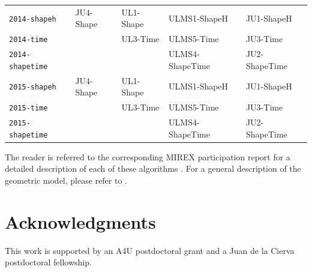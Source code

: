 \documentclass[twoside]{article}
\begin{document}
\begin{table}[!h]
\begin{tabular}{l|llll}
	\texttt{2014-shapeh}     & \textsf{JU4-Shape}      & \textsf{UL1-Shape} & \textsf{ULMS1-ShapeH}    & \textsf{JU1-ShapeH}    \\
	\texttt{2014-time}       &                         & \textsf{UL3-Time}  & \textsf{ULMS5-Time}      & \textsf{JU3-Time}      \\
	\texttt{2014-shapetime}  &                         &                    & \textsf{ULMS4-ShapeTime} & \textsf{JU2-ShapeTime} \\ \hline
	\texttt{2015-shapeh}     & \textsf{JU4-Shape}      & \textsf{UL1-Shape} & \textsf{ULMS1-ShapeH}    & \textsf{JU1-ShapeH}    \\
	\texttt{2015-time}       &                         & \textsf{UL3-Time}  & \textsf{ULMS5-Time}      & \textsf{JU3-Time}      \\
	\texttt{2015-shapetime}  &                         &                    & \textsf{ULMS4-ShapeTime} & \textsf{JU2-ShapeTime} \\ \hline
\end{tabular}
\end{table}

The reader is referred to the corresponding MIREX participation report for a detailed description of each of these algorithms \cite{Urbano2010:mirex2010,Urbano2011:mirex2011,Urbano2012:mirex2012,Urbano2013:mirex2013,Urbano2014:mirex2014,Urbano2015:mirex2015}. For a general description of the geometric model, please refer to \cite{Urbano2011:shape}.

\section*{Acknowledgments}
This work is supported by an A4U postdoctoral grant and a Juan de la Cierva postdoctoral fellowship.



\end{document}
